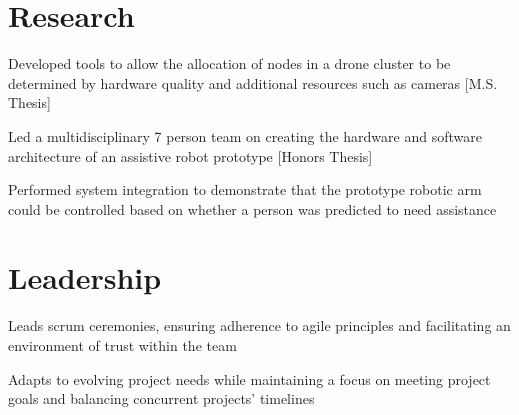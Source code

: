 \documentclass[]{resume-formatting}
\begin{document}
\begin{minipage}[t]{0.7\textwidth}
\section{Research}
\descript{} 
\begin{tightemize}
\item Developed tools to allow the allocation of nodes in a drone cluster to be determined by hardware quality and additional resources such as cameras [M.S. Thesis]
\item Led a multidisciplinary 7 person team on creating the hardware and software architecture of an assistive robot prototype [Honors Thesis]
\item Performed system integration to demonstrate that the prototype robotic arm could be controlled based on whether a person was predicted to need assistance 
\end{tightemize}
\sectionsep



\section{Leadership}
\begin{tightemize}
\item Leads scrum ceremonies, ensuring adherence to agile principles and facilitating an environment of trust within the team
\item Adapts to evolving project needs while maintaining a focus on meeting project goals and balancing concurrent projects' timelines
\end{tightemize}
\sectionsep


\end{minipage}
\end{document}
